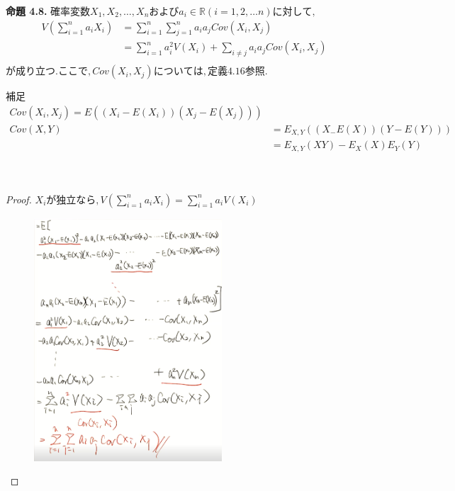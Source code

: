\documentclass[dvipdfmx,10pt, a4j]{jarticle}
\theoremstyle{definition}
\begin{document}
\noindent
\textbf{命題 4.8.} $確率変数 X_1, X_2, \dots, X_n および a_i \in \mathbb{R} (i = 1,2, \dots n)に対して,$\\
\begin{align*}
    V \left(\sum_{i=1}^{n}a_i X_i \right) &= \sum_{i=1}^{n}\sum_{j=1}^{n}a_i a_j Cov(X_i, X_j)\\
    &= \sum_{i=1}^{n}a_i^2V(X_i) + \sum_{i \neq j}a_i a_j Cov(X_i, X_j)\\
\end{align*}
$が成り立つ.ここで, Cov(X_i, X_j)については, 定義4.16参照.$\\
\begin{itembox}[l]{補足}
    \begin{align*}
        Cov(X_i, X_j) = E((X_i - E(X_i))(X_j - E(X_j)))\\
        Cov(X, Y) &= E_{X, Y}((X_ - E(X))(Y - E(Y)))\\
        &= E_{X, Y}(X Y) - E_{X}(X)E_{Y}(Y)\\
    \end{align*}
\end{itembox}\\
\begin{proof}
    $X_i が独立なら, V(\sum_{i=1}^{n}a_iX_i) = \sum_{i=1}^{n}a_iV(X_i)$\\
    \begin{figure}[htbp]
    \begin{center}
    \includegraphics[width=7.0cm]{D_10/img_4.png}
    \caption{}
    \end{center}
    \end{figure}
\end{proof}
\end{document}
